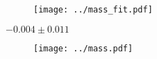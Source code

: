 \documentclass{aastex61}   	%
\begin{document}
\begin{figure}[htbp] %
   \centering
   \texttt{[image: ../mass\_fit.pdf]}
   \caption{
   \label{mass_fit:fig}}
\end{figure}


$ -0.004 \pm   0.011$

\begin{figure}[htbp] %
   \centering
   \texttt{[image: ../mass.pdf]}
   \caption{
   \label{mass:fig}}
\end{figure}



\end{document}

